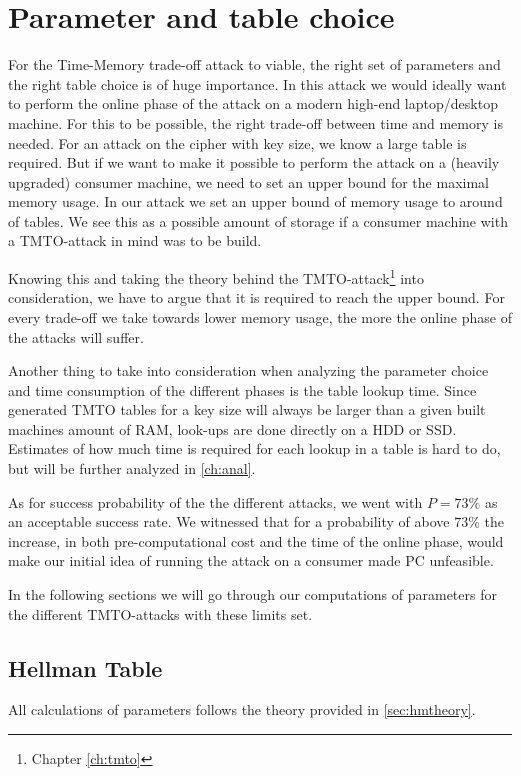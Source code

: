 \chapter{Parameter and table choice}
\label{ch:param}
For the Time-Memory trade-off attack to viable, the right set of
parameters and the right table choice is of huge importance. In this
attack we would ideally want to perform the online phase of the  attack on a modern
high-end laptop/desktop machine. For this to be possible, the right
trade-off between time and memory is needed. For an attack on the
cipher with  key size, we know a large table is required. But if
we want to make it possible to perform the attack on a (heavily
upgraded) consumer
machine, we need to set an upper bound for the maximal memory
usage. In our attack we set an upper bound of memory usage to around
 of tables. We see this as a possible amount of storage if a
consumer machine with a TMTO-attack in mind was to be build.

Knowing this and taking the theory behind the
TMTO-attack\footnote{Chapter \ref{ch:tmto}} into consideration, we
have to argue that it is required to reach the upper bound. For every
trade-off we take towards lower memory usage, the more the online phase of the
attacks will suffer.

Another thing to take into consideration when analyzing the parameter
choice and time consumption of the different phases is the table lookup
time. Since generated TMTO tables for a  key size will
always be larger than a given built machines amount of RAM, look-ups are
done directly on a HDD or SSD. Estimates of how much time is required
for each lookup in a table is hard to do, but will be further analyzed
in \ref{ch:anal}.

As for success probability of the
the different attacks, we went with $P = 73\%$ as an acceptable
success rate.
We witnessed that for a probability of above $73\%$ the increase,
in both pre-computational cost and the time of the online phase, would
make our initial idea of running the attack on a consumer made PC
unfeasible.

In the following sections we will go through our computations of
parameters for the different TMTO-attacks with these limits set.

\section{Hellman Table}
All calculations of parameters follows the theory provided in
\ref{sec:hmtheory}.

